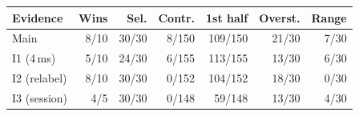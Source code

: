 \setlength{\tabcolsep}{2pt}\begin{tabular}{@{}lrrrrrr@{}}
\toprule
Evidence & Wins & Sel. & Contr. & 1st half & Overst. & Range \\
\midrule
Main & 8/10 & 30/30 & 8/150 & 109/150 & 21/30 & 7/30 \\
I1 (4\,ms) & 5/10 & 24/30 & 6/155 & 113/155 & 13/30 & 6/30 \\
I2 (relabel) & 8/10 & 30/30 & 0/152 & 104/152 & 18/30 & 0/30 \\
I3 (session) & 4/5 & 30/30 & 0/148 & 59/148 & 13/30 & 4/30 \\
\bottomrule
\end{tabular}
